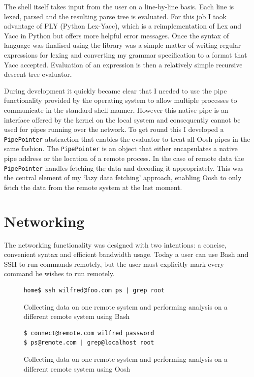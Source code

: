 \documentclass[12pt,twoside,notitlepage]{report}
\begin{document}
The shell itself takes input from the user on a line-by-line
basis. Each line is lexed, parsed and the resulting parse tree is
evaluated. For this job I took advantage of PLY (Python Lex-Yacc),
which is a reimplementation of Lex and Yacc in Python but offers more
helpful error messages. Once the syntax of language was finalised
using the library was a simple matter of writing regular expressions
for lexing and converting my grammar specification to a format that
Yacc accepted. Evaluation of an expression is then a relatively simple
recursive descent tree evaluator.

During development it quickly became clear that I needed to use the
pipe functionality provided by the operating system to allow multiple
processes to communicate in the standard shell manner. However this
native pipe is an interface offered by the kernel on the local system
and consequently cannot be used for pipes running over the network. To
get round this I developed a {\tt PipePointer} abstraction that
enables the evaluator to treat all Oosh pipes in the same fashion. The
{\tt PipePointer} is an object that either encapsulates a native pipe
address or the location of a remote process. In the case of remote
data the {\tt PipePointer} handles fetching the data and decoding it
appropriately. This was the central element of my `lazy data fetching'
approach, enabling Oosh to only fetch the data from the remote system
at the last moment.

\section{Networking}
\label{networking}

The networking functionality was designed with two intentions: a concise,
convenient syntax and efficient bandwidth usage. Today a user can use Bash and
SSH to run commands remotely, but the user must explicitly mark every
command he wishes to run remotely.

\begin{figure}[h]
\begin{verbatim}
home$ ssh wilfred@foo.com ps | grep root
\end{verbatim}
\caption{Collecting data on one remote system and performing analysis
  on a different remote system using Bash}
\label{sshremote}
\end{figure}

\begin{figure}[h]
\begin{verbatim}
$ connect@remote.com wilfred password
$ ps@remote.com | grep@localhost root
\end{verbatim}
\caption{Collecting data on one remote system and performing analysis
  on a different remote system using Oosh}
\end{figure}
\end{document}
